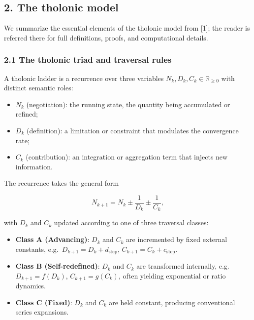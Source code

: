 \documentclass[
  11pt,
  letterpaper,
]{article}
\providecommand{\tightlist}{%
  \setlength{\itemsep}{0pt}\setlength{\parskip}{0pt}}
\begin{document}
\subsection{2. The tholonic model}\label{the-tholonic-model}

We summarize the essential elements of the tholonic model from {[}1{]};
the reader is referred there for full definitions, proofs, and
computational details.

\subsubsection{2.1 The tholonic triad and traversal
rules}\label{the-tholonic-triad-and-traversal-rules}

A tholonic ladder is a recurrence over three variables
\(N_k, D_k, C_k \in \mathbb{R}_{\geq 0}\) with distinct semantic roles:

\begin{itemize}
\tightlist
\item
  \textbf{\(N_k\)} (negotiation): the running state, the quantity being
  accumulated or refined;
\item
  \textbf{\(D_k\)} (definition): a limitation or constraint that
  modulates the convergence rate;
\item
  \textbf{\(C_k\)} (contribution): an integration or aggregation term
  that injects new information.
\end{itemize}

The recurrence takes the general form

\[
N_{k+1} = N_k \pm \frac{1}{D_k} \pm \frac{1}{C_k},
\]

with \(D_k\) and \(C_k\) updated according to one of three traversal
classes:

\begin{itemize}
\tightlist
\item
  \textbf{Class A (Advancing)}: \(D_k\) and \(C_k\) are incremented by
  fixed external constants, e.g.~\(D_{k+1} = D_k + d_\text{step}\),
  \(C_{k+1} = C_k + c_\text{step}\).
\item
  \textbf{Class B (Self-redefined)}: \(D_k\) and \(C_k\) are transformed
  internally, e.g.~\(D_{k+1} = f(D_k)\), \(C_{k+1} = g(C_k)\), often
  yielding exponential or ratio dynamics.
\item
  \textbf{Class C (Fixed)}: \(D_k\) and \(C_k\) are held constant,
  producing conventional series expansions.
\end{itemize}
\end{document}
